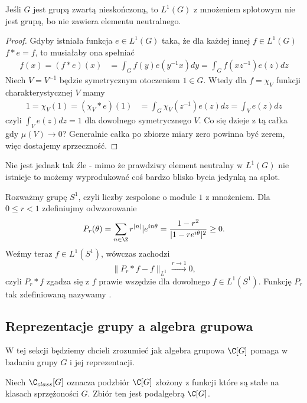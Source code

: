 \begin{remark}{}{}
  Jeśli $G$ jest grupą zwartą nieskończoną, to $L^1(G)$ z mnożeniem splotowym nie jest grupą, bo nie zawiera elementu neutralnego.
\end{remark}

\begin{proof}
  Gdyby istniała funkcja $e\in L^1(G)$ taka, że dla każdej innej $f\in L^1(G)$ $f\ast e=f$, to musiałaby ona spełniać
  \begin{align*}
    f(x)=(f\ast e)(x)&=\int_{G}f(y)e(y^{-1}x)dy=\int_{G}f(xz^{-1})e(z)dz
  \end{align*}
  Niech $V=V^{-1}$ będzie symetrycznym otoczeniem $1\in G$. Wtedy dla $f=\chi_V$ funkcji charakterystycznej $V$ mamy
  \begin{align*}
    1=\chi_V(1)=(\chi_V\ast e)(1)&=\int_{G}\chi_V(z^{-1})e(z)dz=\int_{V}e(z)dz
  \end{align*}
  czyli $\int_V e(z)dz=1$ dla dowolnego symetrycznego $V$. Co się dzieje z tą całka gdy $\mu(V)\to 0$? Generalnie całka po zbiorze miary zero powinna być zerem, więc dostajemy sprzeczność.
\end{proof}

Nie jest jednak tak źle - mimo że prawdziwy element neutralny w $L^1(G)$ nie istnieje to możemy wyprodukować coś bardzo blisko bycia jedynką na splot.

\begin{example}
  Rozważmy grupę $S^1$, czyli liczby zespolone o module $1$ z mnożeniem. Dla $0\leq r< 1$ zdefiniujmy odwzorowanie
  $$P_r(\theta)=\sum_{n\in\Z}r^{|n|}|e^{in\theta}=\frac{1-r^2}{|1-re^{i\theta}|^2}\geq0.$$
 Weźmy teraz $f\in L^1(S^1)$, wówczas zachodzi
 $$\|P_r\ast f-f\|_{L^1}\xrightarrow{r\to 1} 0,$$
 czyli $P_r\ast f$ zgadza się z $f$ prawie wszędzie dla dowolnego $f\in L^1(S^1)$. Funkcję $P_r$ tak zdefiniowaną nazywamy .
\end{example}

\subsection{Reprezentacje grupy a algebra grupowa}

W tej sekcji będziemy chcieli zrozumieć jak algebra grupowa $\C[G]$ pomaga w badaniu grupy $G$ i jej reprezentacji.

\begin{lemma}{}{}
  Niech $\C_{class}[G]$ oznacza podzbiór $\C[G]$ złożony z funkcji które są stałe na klasach sprzężoności $G$. Zbiór ten jest podalgebrą $\C[G]$.
\end{lemma}

